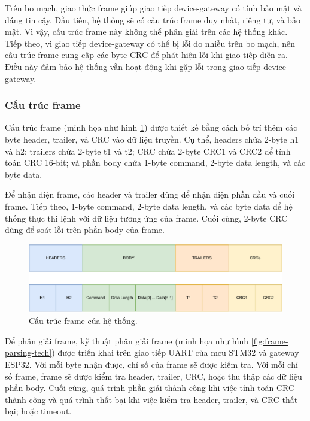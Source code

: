 Trên bo mạch, giao thức frame giúp giao tiếp device-gateway có tính bảo mật và đáng tin cậy. Đầu tiên, hệ thống sẽ có cấu trúc frame duy nhất, riêng tư, và bảo mật. Vì vậy, cấu trúc frame này không thể phân giải trên các hệ thống khác. Tiếp theo, vì giao tiếp device-gateway có thể bị lỗi do nhiễu trên bo mạch, nên cấu trúc frame cung cấp các byte CRC để phát hiện lỗi khi giao tiếp diễn ra. Điều này đảm bảo hệ thống vẫn hoạt động khi gặp lỗi trong giao tiếp device-gateway.

\subsubsection{Cấu trúc frame}

Cấu trúc frame (minh họa như hình \ref{fig:Frame-Structure-Overview}) được thiết kế bằng cách bố trí thêm các byte header, trailer, và CRC vào dữ liệu truyền. Cụ thể, headers chứa 2-byte h1 và h2; trailers chứa 2-byte t1 và t2; CRC chứa 2-byte CRC1 và CRC2 để tính toán CRC 16-bit; và phần body chứa 1-byte command, 2-byte data length, và các byte data.

Để nhận diện frame, các header và trailer dùng để nhận diện phần đầu và cuối frame. Tiếp theo, 1-byte command, 2-byte data length, và các byte data để hệ thống thực thi lệnh với dữ liệu tương ứng của frame. Cuối cùng, 2-byte CRC dùng để soát lỗi trên phần body của frame.

\begin{figure}[htp]
\centering
\includegraphics[width=0.9\linewidth]{images/Thesis-Page-4-Frame-Structure-Overview.pdf}
\caption{Cấu trúc frame của hệ thống.}
\label{fig:Frame-Structure-Overview}
\end{figure}


Để phân giải frame, kỹ thuật phân giải frame (minh họa như hình \ref{fig:frame-parsing-tech}) được triển khai trên giao tiếp UART của \acrshort{mcu} STM32 và gateway ESP32. Với mỗi byte nhận được, chỉ số của frame sẽ được kiểm tra. Với mỗi chỉ số frame, frame sẽ được kiểm tra header, trailer, CRC, hoặc thu thập các dữ liệu phần body. Cuối cùng, quá trình phần giải thành công khi việc tính toán CRC thành công và quá trình thất bại khi việc kiểm tra header, trailer, và CRC thất bại; hoặc timeout.

